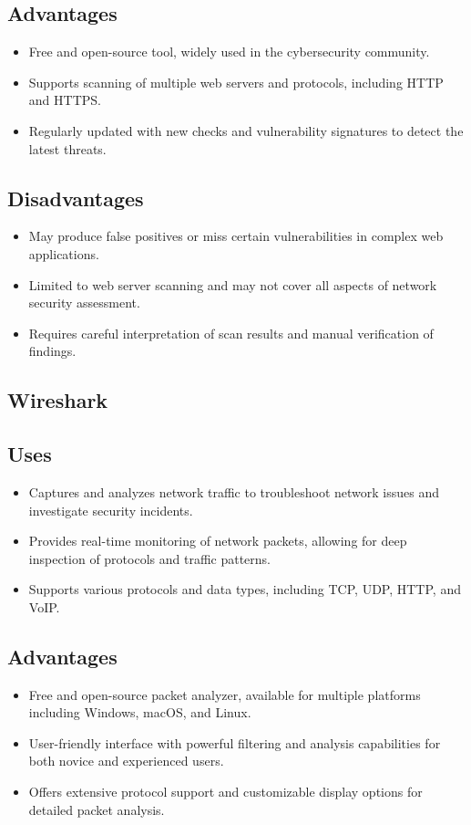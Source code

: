 \documentclass[11pt]{article}
\begin{document}
\subsection{Advantages}
\begin{itemize}
    \item Free and open-source tool, widely used in the cybersecurity community.
    \item Supports scanning of multiple web servers and protocols, including HTTP and HTTPS.
    \item Regularly updated with new checks and vulnerability signatures to detect the latest threats.
\end{itemize}

\subsection{Disadvantages}
\begin{itemize}
    \item May produce false positives or miss certain vulnerabilities in complex web applications.
    \item Limited to web server scanning and may not cover all aspects of network security assessment.
    \item Requires careful interpretation of scan results and manual verification of findings.
\end{itemize}

\subsection{Wireshark}

\subsection{Uses}
\begin{itemize}
    \item Captures and analyzes network traffic to troubleshoot network issues and investigate security incidents.
    \item Provides real-time monitoring of network packets, allowing for deep inspection of protocols and traffic patterns.
    \item Supports various protocols and data types, including TCP, UDP, HTTP, and VoIP.
\end{itemize}

\subsection{Advantages}
\begin{itemize}
    \item Free and open-source packet analyzer, available for multiple platforms including Windows, macOS, and Linux.
    \item User-friendly interface with powerful filtering and analysis capabilities for both novice and experienced users.
    \item Offers extensive protocol support and customizable display options for detailed packet analysis.
\end{itemize}
\end{document}
